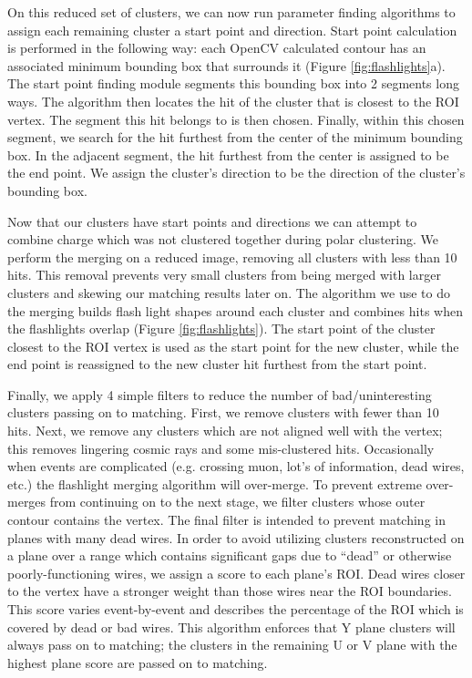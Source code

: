 \documentclass[12pt]{article}
\begin{document}
\par On this reduced set of clusters, we can now run parameter finding algorithms to assign each remaining cluster a start point and direction. Start point calculation is performed in the following way: each OpenCV calculated contour has an associated minimum bounding box that surrounds it (Figure \ref{fig:flashlights}a). The start point finding module segments this bounding box into 2 segments long ways. The algorithm then locates the hit of the cluster that is closest to the ROI vertex.  The segment this hit belongs to is then chosen. Finally, within this chosen segment, we search for the hit furthest from the center of the minimum bounding box. In the adjacent segment, the hit furthest from the center is assigned to be the end point. We assign the cluster's direction to be the direction of the cluster's bounding box.
\par Now that our clusters have start points and directions we can attempt to combine charge which was not clustered together during polar clustering. We perform the merging on a reduced image, removing all clusters with less than 10 hits. This removal prevents very small clusters from being merged with larger clusters and skewing our matching results later on.  The algorithm we use to do the merging builds flash light shapes around each cluster and combines hits when the flashlights overlap (Figure \ref{fig:flashlights}). The start point of the cluster closest to the ROI vertex is used as the start point for the new cluster, while the end point is reassigned to the new cluster hit furthest from the start point.
\par Finally, we apply 4 simple filters to reduce the number of bad/uninteresting clusters passing on to matching. First, we remove clusters with fewer than 10 hits.  Next, we remove any clusters which are not aligned well with the vertex; this removes lingering cosmic rays and some mis-clustered hits. Occasionally when events are complicated (e.g. crossing muon, lot's of information, dead wires, etc.) the flashlight merging algorithm will over-merge.  To prevent extreme over-merges from continuing on to the next stage, we filter clusters whose outer contour contains the vertex. The final filter is intended to prevent matching in planes with many dead wires.  In order to avoid utilizing clusters reconstructed on a plane over a range which contains significant gaps due to ``dead'' or otherwise poorly-functioning wires, we assign a score to each plane's ROI. Dead wires closer to the vertex have a stronger weight than those wires near the ROI boundaries. This score varies event-by-event and describes the percentage of the ROI which is covered by dead or bad wires. This algorithm enforces that Y plane clusters will always pass on to matching; the clusters in the remaining U or V plane with the highest plane score are passed on to matching. 
\end{document}
